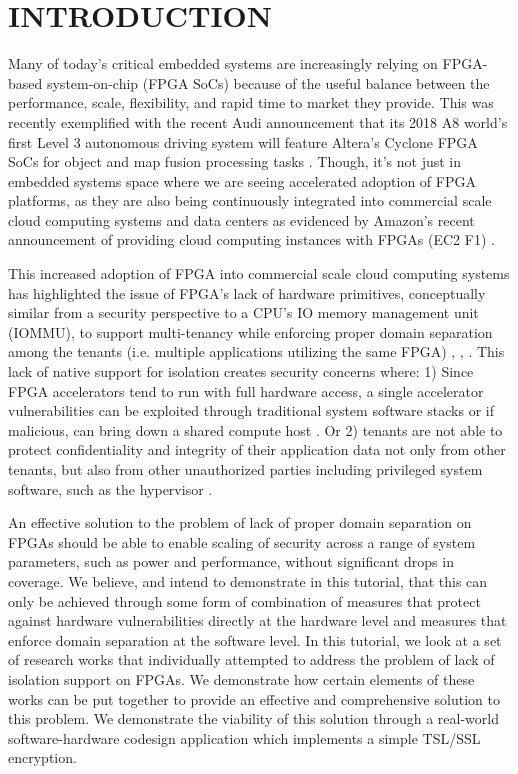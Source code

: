\documentclass[sigconf]{acmart}
\theoremstyle{plain}
\theoremstyle{remark}
\begin{document}
\maketitle


\section{INTRODUCTION}\label{sec:intro}
Many of today's critical embedded systems are increasingly relying on FPGA-based system-on-chip (FPGA SoCs) because of the useful balance between the performance, scale, flexibility, and rapid time to market they provide. This was recently exemplified with the recent Audi announcement that its 2018 A8 world's first Level 3 autonomous driving system will feature Altera's Cyclone FPGA SoCs for object and map fusion processing tasks \cite{iintel}. Though, it's not just in embedded systems space where we are seeing accelerated adoption of FPGA platforms, as they are also being continuously integrated into commercial scale cloud computing systems and data centers as evidenced by Amazon's recent announcement of providing cloud computing instances with FPGAs (EC2 F1) \cite{amazon}.

This increased adoption of FPGA into commercial scale cloud computing systems has highlighted the issue of FPGA's lack of hardware primitives, conceptually similar from a security perspective to a CPU's IO memory management unit (IOMMU), to support multi-tenancy while enforcing proper domain separation among the tenants (i.e. multiple applications utilizing the same FPGA) \cite{CloudFPGA}, \cite{CapslHOST}, \cite{Byma2014FPGAsIT}. This lack of native support for isolation creates security concerns where: 1) Since FPGA accelerators tend to run with full hardware access, a single accelerator vulnerabilities can be exploited through traditional system software stacks or if malicious, can bring down a shared compute host \cite{CloudFPGA}. Or 2) tenants are not able to protect confidentiality and integrity of their application  data not only from other tenants, but also from other unauthorized parties including privileged system software, such as the hypervisor \cite{sconee}.

An effective solution to the problem of lack of proper domain separation on FPGAs should be able to enable scaling of security across a range of system parameters, such as power and performance, without significant drops in coverage. We believe, and intend to demonstrate in this tutorial, that this can only be achieved through some form of combination of measures that protect against hardware vulnerabilities directly at the hardware level and measures that enforce domain separation at the software level. In this tutorial, we look at a set of  research works that individually attempted to address the problem of lack of isolation support on FPGAs. We demonstrate how certain elements of these works can be put together to provide an effective and comprehensive solution to this problem. We demonstrate the viability of this solution through a real-world software-hardware codesign application which implements a simple TSL/SSL encryption.
\end{document}
